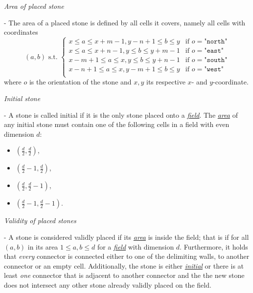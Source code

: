 \documentclass{scrartcl}
\begin{document}
\begin{mdframed}
  \hypertarget{area}{\emph{Area of placed stone}} - The area of a placed stone 
  is defined by all cells it covers, namely all cells with coordinates 
  \begin{equation*}
    (a, b) \text{ s.t. }
    \begin{cases}
      x\leq a\leq x + m - 1, y - n + 1\leq b\leq y &\text{if }o = \texttt{"north"}\\
      x\leq a\leq x + n - 1, y\leq b\leq y + m - 1 &\text{if }o = \texttt{"east"}\\
      x - m + 1\leq a\leq x, y\leq b\leq y + n - 1 &\text{if }o = \texttt{"south"}\\
      x - n + 1\leq a\leq x, y - m + 1\leq b\leq y &\text{if }o = \texttt{"west"}\\
    \end{cases}
  \end{equation*}
  where $o$ is the orientation of the stone and $x, y$ its respective $x$- and
  $y$-coordinate.
\end{mdframed}
\begin{mdframed}
  \hypertarget{initial}{\emph{Initial stone}} - A stone is called initial if it 
  is the only stone placed onto a \hyperlink{field}{\emph{field}}. The 
  \hyperlink{area}{\emph{area}} of any initial stone must contain one of the 
  following cells in a field with even dimension $d$:
  \begin{itemize}
    \item $(\frac{d}{2}, \frac{d}{2})$,
    \item $(\frac{d}{2} - 1, \frac{d}{2})$,
    \item $(\frac{d}{2}, \frac{d}{2} - 1)$,
    \item $(\frac{d}{2} - 1, \frac{d}{2} - 1)$.
  \end{itemize}
\end{mdframed}
\begin{mdframed}
  \hypertarget{valid}{\emph{Validity of placed stones}} - A stone is considered 
  validly placed if its \hyperlink{area}{\emph{area}} is inside the field; that 
  is if for all $(a, b)$ in its area $1\leq a, b\leq d$ for a 
  \hyperlink{field}{\emph{field}} with dimension $d$. Furthermore, it holds 
  that \emph{every} connector is connected either to one of the delimiting 
  walls, to another connector or an empty cell. Additionally, the stone is 
  either \hyperlink{initial}{\emph{initial}} or there is at least \emph{one} 
  connector that is adjacent to another connector and the the new stone does
  not intersect any other stone already validly placed on the field.
\end{mdframed}
\end{document}
